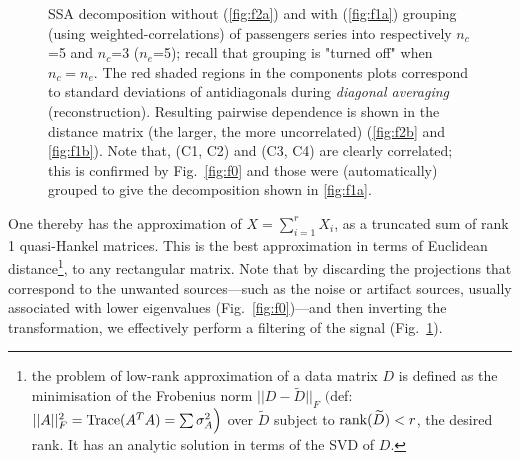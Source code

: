 \documentclass{article}
\begin{document}
\begin{figure}
  \caption{SSA decomposition without (\ref{fig:f2a}) and with (\ref{fig:f1a}) grouping (using weighted-correlations) of passengers series into respectively $n_c$=5 and $n_c$=3 ($n_e$=5); recall that grouping is "turned off" when $n_c=n_e$. The red shaded regions in the components plots correspond to standard deviations of antidiagonals during \textit{diagonal averaging} (reconstruction). Resulting pairwise dependence is shown in the distance matrix (the larger, the more uncorrelated) (\ref{fig:f2b} and \ref{fig:f1b}). Note that, (C1, C2) and (C3, C4) are clearly correlated; this is confirmed by Fig.~\ref{fig:f0} and those were (automatically) grouped to give the decomposition shown in \ref{fig:f1a}.}
  \label{fig:f1}
\end{figure}



One thereby has the approximation of $X=\sum_{i=1}^r X_i$, as a truncated sum of rank 1 quasi-Hankel matrices. This is the best approximation in terms of Euclidean distance\footnote{the problem of low-rank approximation of a data matrix $D$ is defined as the minimisation of the Frobenius norm $||D-\widetilde{D}||_F$ $\Big($def: $||A||^2_F=\textmd{Trace}(A^TA)=\sum \sigma^2_A\Big)$ over $\widetilde{D}$ subject to $\textmd{rank}(\widetilde{D})<r$, the desired rank. It has an analytic solution in terms of the SVD of $D$.}, to any rectangular matrix. Note that by discarding the projections that correspond to the unwanted sources---such as the noise or artifact sources, usually associated with lower eigenvalues (Fig.~\ref{fig:f0})---and then inverting the transformation, we effectively perform a filtering of the signal (Fig.~\ref{fig:f1}). \\
\end{document}
